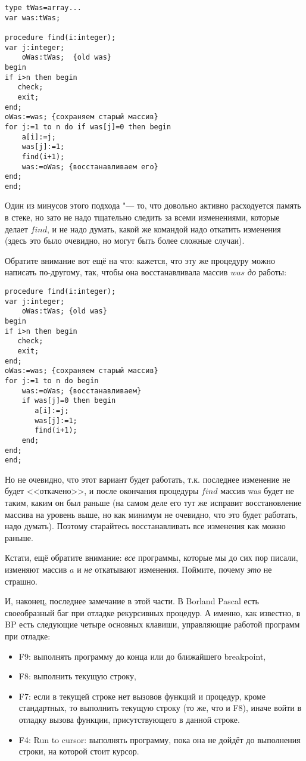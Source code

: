 \begin{codesampleo}\begin{verbatim}
type tWas=array...
var was:tWas;

procedure find(i:integer);
var j:integer;
    oWas:tWas;  {old was}
begin
if i>n then begin
   check;
   exit;
end;
oWas:=was; {сохраняем старый массив}
for j:=1 to n do if was[j]=0 then begin
    a[i]:=j;
    was[j]:=1;
    find(i+1);
    was:=oWas; {восстанавливаем его}
end;
end;
\end{verbatim}
\end{codesampleo}

Один из минусов этого подхода "--- то, что довольно активно расходуется память в 
стеке, но зато не надо тщательно следить за всеми изменениями, которые делает 
$find$, и не надо думать, какой же командой надо откатить изменения (здесь это было очевидно, но могут быть более сложные случаи).

Обратите внимание вот ещё на что: кажется, что эту же процедуру можно написать 
по-другому, так, чтобы она восстанавливала массив $was$ \textit{до} работы:

\begin{codesampleo}\begin{verbatim}
procedure find(i:integer);
var j:integer;
    oWas:tWas; {old was}
begin
if i>n then begin
   check;
   exit;
end;
oWas:=was; {сохраняем старый массив}
for j:=1 to n do begin
    was:=oWas; {восстанавливаем}
    if was[j]=0 then begin
       a[i]:=j;
       was[j]:=1;
       find(i+1);
    end;
end;
end;
\end{verbatim}
\end{codesampleo}

Но не очевидно, что этот вариант будет работать, т.к. последнее изменение не 
будет <<откачено>>, и после окончания процедуры $find$ массив was будет не таким, 
каким он был раньше (на самом деле его тут же исправит восстановление массива 
на уровень выше, но как минимум не очевидно, что это будет работать, надо думать). 
Поэтому старайтесь восстанавливать все изменения как можно раньше.

Кстати, ещё обратите внимание: \textit{все} программы, которые мы до сих пор писали, изменяют массив 
$a$ и \textit{не} откатывают изменения. Поймите, почему \textit{это} не страшно.

И, наконец, последнее замечание в этой части. В Borland Pascal есть своеобразный 
баг при отладке рекурсивных процедур. А именно, как известно, в BP есть 
следующие четыре основных клавиши, управляющие работой программ при отладке:
\begin{itemize}
\item F9: выполнять программу до конца или до ближайшего breakpoint,
\item F8: выполнить текущую строку,
\item F7: если в текущей строке нет вызовов функций и процедур, кроме стандартных, то 
    выполнить текущую строку (то же, что и F8),
    иначе войти в отладку вызова функции, присутствующего в данной строке.
\item F4: Run to cursor: выполнять программу, пока она не дойдёт до выполнения 
    строки, на которой стоит курсор.
\end{itemize}
    
